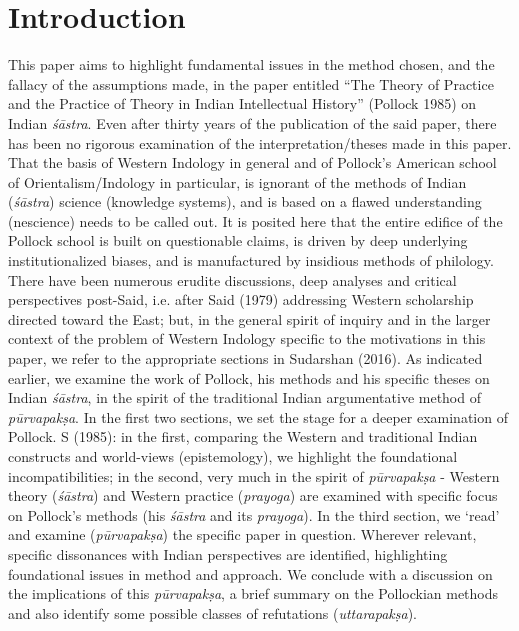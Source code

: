\section*{Introduction}

This paper aims to highlight fundamental issues in the method chosen, and the fallacy of the assumptions made, in the paper entitled ``The Theory of Practice and the Practice of Theory in Indian Intellectual History'' (Pollock 1985) on Indian {\sl śāstra}. Even after thirty years of the publication of the said paper, there has been no rigorous examination of the interpretation/theses made in this paper. That the basis of Western Indology in general and of Pollock's American school of Orientalism/Indology in particular, is ignorant of the methods of Indian ({\sl śāstra}) science (knowledge systems), and is based on a flawed understanding (nescience) needs to be called out. It is posited here that the entire edifice of the Pollock school is built on questionable claims, is driven by deep underlying institutionalized biases, and is manufactured by insidious methods of philology. There have been numerous erudite discussions, deep analyses and critical perspectives post-Said, i.e. after Said (1979) addressing Western scholarship directed toward the East; but, in the general spirit of inquiry and in the larger context of the problem of Western Indology specific to the motivations in this paper, we refer to the appropriate sections in Sudarshan (2016).  As indicated earlier, we examine the work of Pollock, his methods and his specific theses on Indian {\sl śāstra}, in the spirit of the traditional Indian argumentative method of {\sl pūrvapakṣa}. In the first two sections, we set the stage for a deeper examination of Pollock. S (1985): in the first, comparing the Western and traditional Indian constructs and world-views (epistemology), we highlight the foundational incompatibilities; in the second, very much in the spirit of {\sl pūrvapakṣa} - Western theory ({\sl śāstra}) and Western practice ({\sl prayoga}) are examined with specific focus on Pollock's methods (his {\sl śāstra} and its {\sl prayoga}). In the third section, we `read' and examine ({\sl pūrvapakṣa}) the specific paper in question. Wherever relevant, specific dissonances with Indian perspectives are identified, highlighting foundational issues in method and approach. We conclude with a discussion on the implications of this {\sl pūrvapakṣa}, a brief summary on the Pollockian methods and also identify some possible classes of refutations ({\sl uttarapakṣa}).

